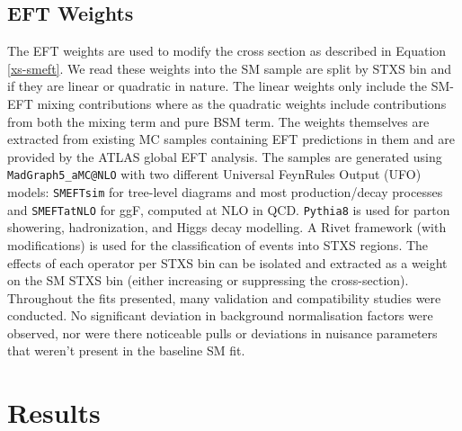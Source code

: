 \subsection{EFT Weights}
The EFT weights are used to modify the cross section as described in Equation \ref{xs-smeft}. We read these weights into the SM sample are split by STXS bin and if they are linear or quadratic in nature. The linear weights only include the SM-EFT mixing contributions where as the quadratic weights include contributions from both the mixing term and pure BSM term. The weights themselves are extracted from existing MC samples containing EFT predictions in them and are provided by the ATLAS global EFT analysis. The samples are generated using \verb|MadGraph5_aMC@NLO| with two different Universal FeynRules Output (UFO) models: \verb|SMEFTsim| for tree-level diagrams and most production/decay processes and \verb|SMEFTatNLO| for ggF, computed at NLO in QCD. \verb|Pythia8| is used for parton showering, hadronization, and Higgs decay modelling. A Rivet framework (with modifications) is used for the classification of events into STXS regions. The effects of each operator per STXS bin can be isolated and extracted as a weight on the SM STXS bin (either increasing or suppressing the cross-section). Throughout the fits presented, many validation and compatibility studies were conducted. No significant deviation in background normalisation factors were observed, nor were there noticeable pulls or deviations in nuisance parameters that weren’t present in the baseline SM fit.

\section{Results}

